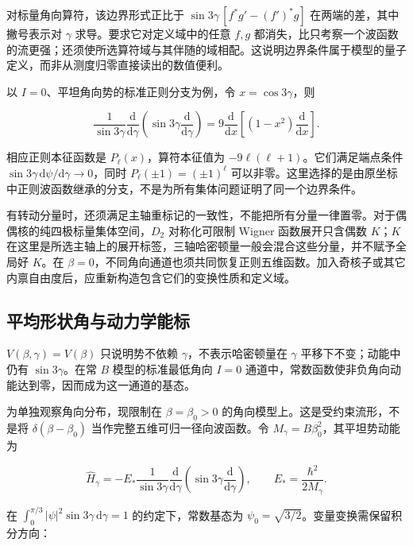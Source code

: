 对标量角向算符，该边界形式正比于 $\sin3\gamma\,[f^*g'-(f')^*g]$ 在两端的差，其中撇号表示对 $\gamma$ 求导。要求它对定义域中的任意 $f,g$ 都消失，比只考察一个波函数的流更强；还须使所选算符域与其伴随的域相配。这说明边界条件属于模型的量子定义，而非从测度归零直接读出的数值便利。

以 $I=0$、平坦角向势的标准正则分支为例，令 $x=\cos3\gamma$，则

\begin{equation}\label{eq:2-4-15}
\frac{1}{\sin3\gamma}\frac{\mathrm d}{\mathrm d\gamma}
\left(\sin3\gamma\frac{\mathrm d}{\mathrm d\gamma}\right)
=9\frac{\mathrm d}{\mathrm dx}
\left[(1-x^2)\frac{\mathrm d}{\mathrm dx}\right].
\end{equation}

相应正则本征函数是 $P_\ell(x)$，算符本征值为 $-9\ell(\ell+1)$。它们满足端点条件 $\sin3\gamma\,\mathrm d\psi/\mathrm d\gamma\to0$，同时 $P_\ell(\pm1)=(\pm1)^\ell$ 可以非零。这里选择的是由原坐标中正则波函数继承的分支，不是为所有集体问题证明了同一个边界条件\cite{bohr-1952-surface-particle-coupling}。

有转动分量时，还须满足主轴重标记的一致性，不能把所有分量一律置零。对于偶偶核的纯四极标量集体空间，$D_2$ 对称化可限制 Wigner 函数展开只含偶数 $K$；$K$ 在这里是所选主轴上的展开标签，三轴哈密顿量一般会混合这些分量，并不赋予全局好 $K$。在 $\beta=0$，不同角向通道也须共同恢复正则五维函数。加入奇核子或其它内禀自由度后，应重新构造包含它们的变换性质和定义域。


\subsection{平均形状角与动力学能标}\label{sec:2-4-5}


$V(\beta,\gamma)=V(\beta)$ 只说明势不依赖 $\gamma$，不表示哈密顿量在 $\gamma$ 平移下不变；动能中仍有 $\sin3\gamma$。在常 $B$ 模型的标准最低角向 $I=0$ 通道中，常数函数使非负角向动能达到零，因而成为这一通道的基态。

为单独观察角向分布，现限制在 $\beta=\beta_0>0$ 的角向模型上。这是受约束流形，不是将 $\delta(\beta-\beta_0)$ 当作完整五维可归一径向波函数。令 $M_\gamma=B\beta_0^2$，其平坦势动能为

\begin{equation}\label{eq:2-4-16}
\hat H_\gamma=-E_*\frac{1}{\sin3\gamma}\frac{\mathrm d}{\mathrm d\gamma}
\left(\sin3\gamma\frac{\mathrm d}{\mathrm d\gamma}\right),
\qquad E_*=\frac{\hbar^2}{2M_\gamma}.
\end{equation}

在 $\int_0^{\pi/3}|\psi|^2\sin3\gamma\,\mathrm d\gamma=1$ 的约定下，常数基态为 $\psi_0=\sqrt{3/2}$。变量变换需保留积分方向：


